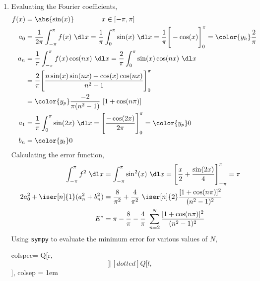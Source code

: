\begin{enumerate}
    \item Evaluating the Fourier coefficients,
          \begin{align}
              f(x) & = \abs{\sin(x)} \qquad\qquad
              x \in [-\pi, \pi]                                              \\
              a_0  & = \frac{1}{2\pi}
              \int_{-\pi}^{\pi} f(x)\ \dl x
              = \frac{1}{\pi}\int_{0}^{\pi} \sin(x)\ \dl x
              = \frac{1}{\pi}\Bigg[ -\cos(x) \Bigg]_0^{\pi}
              = \color{y_h} \frac{2}{\pi}                                    \\
              a_n  & = \frac{1}{\pi}
              \int_{-\pi}^{\pi} f(x) \cos(nx)\ \dl x
              = \frac{2}{\pi}\int_{0}^{\pi} \sin(x) \cos(nx)\ \dl x          \\
                   & = \frac{2}{\pi}\Bigg[ \frac{n\sin(x)\sin(nx)
              + \cos(x)\cos(nx)}{n^2 - 1} \Bigg]_0^{\pi}                     \\
                   & = \color{y_p} \frac{-2}{\pi(n^2 - 1)}\ [1 + \cos(n\pi)] \\
              a_1  & = \frac{1}{\pi}\int_{0}^{\pi} \sin(2x)\ \dl x
              = \Bigg[\frac{-\cos(2x)}{2\pi}\Bigg]_0^{\pi}
              = \color{y_p} 0                                                \\
              b_n  & = \color{y_t} 0
          \end{align}
          Calculating the error function,
          \begin{align}
              \int_{-\pi}^{\pi} f^2\ \dl x         & = \int_{-\pi}^{\pi}
              \sin^2(x)\ \dl x
              = \Bigg[ \frac{x}{2} + \frac{\sin(2x)}{4} \Bigg]_{-\pi}^{\pi}
              = \pi                                                                 \\
              2a_0^2 + \iser[n]{1} (a_n^2 + b_n^2) & = \frac{8}{\pi^2}
              + \frac{4}{\pi^2}\ \iser[n]{2} \frac{[1 + \cos(n\pi)]^2}{(n^2 - 1)^2} \\
              E^*                                  & = \pi - \frac{8}{\pi}
              - \frac{4}{\pi}\ \sum_{n=2}^{N} \frac{[1 + \cos(n\pi)]^2}{(n^2 - 1)^2}
          \end{align}
          Using \texttt{sympy} to evaluate the minimum error for various values of $ N $,
          \begin{table}[H]
              \centering
              \begin{tblr}{colspec={
                  Q[r, $$]|[dotted]Q[l, $$]},
                  colsep = 1em}

\end{tblr}
\end{table}
\end{enumerate}
